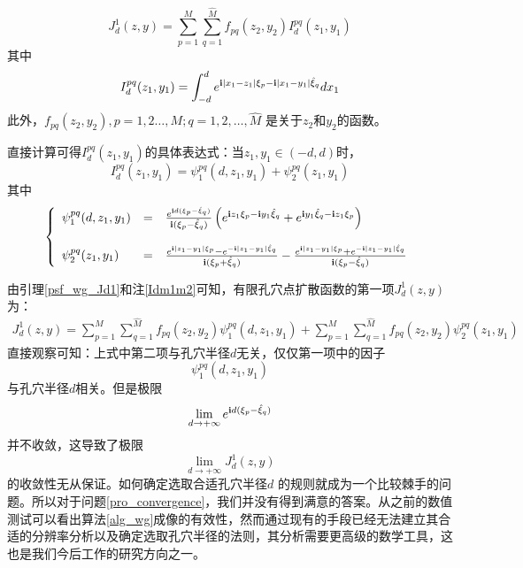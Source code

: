 \begin{lemma}\label{psf_wg_Jd1}
\begin{equation}
  J_d^1(z,y)=\sum\limits_{p=1}^M\sum\limits_{q=1}^{\hat M}f_{pq}(z_2,y_2)I^{pq}_d(z_1,y_1)
\end{equation}
其中
\begin{equation}
I^{pq}_d(z_1,y_1) =\int_{-d}^{d}e^{\mathbf{i}|x_1-z_1|\xi_p-\mathbf{i}|x_1-y_1|\hat\xi_q}dx_1
\end{equation}
此外，$f_{pq}(z_2,y_2),p=1,2\ldots,M;q=1,2,\ldots,\hat M$ 是关于$z_2$和$y_2$的函数。
\end{lemma}
\begin{remark}\label{Idm1m2}
直接计算可得$I_d^{pq}(z_1,y_1)$的具体表达式：当$z_1,y_1\in(-d,d)$时，
\begin{equation}
  I_d^{pq}(z_1,y_1)=\psi^{pq}_1(d,z_1,y_1)+\psi^{pq}_2(z_1,y_1)
\end{equation}
其中
\begin{eqnarray*}
\left\{
\begin{array}{lll}
  \psi^{pq}_1(d,z_1,y_1)&=&\frac{e^{\mathbf{i} d(\xi_{p}-\hat\xi_{q})}}{\mathbf{i}(\xi_{p}-\hat\xi_{q})}\left(e^{\mathbf{i} z_1\xi_{p}-\mathbf{i} y_1\hat\xi_{q}}+e^{\mathbf{i} y_1\hat\xi_{q}-\mathbf{i} z_1\xi_{p}}\right)\\
  & &\\
  \psi^{pq}_2(z_1,y_1)&=&\frac{e^{\mathbf{i}|z_1-y_1|\xi_{p}}-e^{-\mathbf{i}|z_1-y_1|\hat\xi_{q}}}{\mathbf{i}(\xi_{p}+\hat\xi_{q})}
-\frac{e^{\mathbf{i}|z_1-y_1|\xi_{p}}+e^{-\mathbf{i}|z_1-y_1|\hat\xi_{q}}}{\mathbf{i}(\xi_{p}-\hat\xi_{q})}
\end{array}
\right.
\end{eqnarray*}
\end{remark}

由引理\ref{psf_wg_Jd1}和注\ref{Idm1m2}可知，有限孔穴点扩散函数的第一项$J_d^1(z,y)$为：
\begin{eqnarray}
J_d^1(z,y)=\sum\limits_{p=1}^M\sum\limits_{q=1}^{\hat M}f_{pq}(z_2,y_2)\psi^{pq}_1(d,z_1,y_1)+
\sum\limits_{p=1}^M\sum\limits_{q=1}^{\hat M}f_{pq}(z_2,y_2)\psi^{pq}_2(z_1,y_1)\qquad
\end{eqnarray}
直接观察可知：上式中第二项与孔穴半径$d$无关，仅仅第一项中的因子
$$\psi^{pq}_1(d,z_1,y_1)$$
与孔穴半径$d$相关。但是极限
\begin{equation}
 \lim\limits_{d\rightarrow+\infty}e^{\mathbf{i} d(\xi_{p}-\hat\xi_{q})}
\end{equation}
并不收敛，这导致了极限
\begin{equation}
\lim\limits_{d\rightarrow+\infty}J_d^1(z,y)
\end{equation}
的收敛性无从保证。如何确定选取合适孔穴半径$d$ 的规则就成为一个比较棘手的问题。所以对于问题\ref{pro_convergence}，我们并没有得到满意的答案。从之前的数值测试可以看出算法\ref{alg_wg}成像的有效性，然而通过现有的手段已经无法建立其合适的分辨率分析以及确定选取孔穴半径的法则，其分析需要更高级的数学工具，这也是我们今后工作的研究方向之一。

